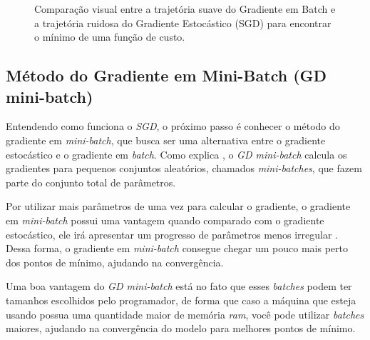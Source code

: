 \begin{figure}[h!]
    \caption{Comparação visual entre a trajetória suave do Gradiente em Batch e a trajetória ruidosa do Gradiente Estocástico (SGD) para encontrar o mínimo de uma função de custo.}
    \label{fig:comparativo-gd-sgd}
\end{figure}

\subsection{Método do Gradiente em Mini-Batch (GD mini-batch)}

Entendendo como funciona o \textit{SGD}, o próximo passo é conhecer o método do gradiente em \textit{mini-batch}, que busca ser uma alternativa entre o gradiente estocástico e o gradiente em \textit{batch}. Como explica \textcite{MaosAObra}, o \textit{GD mini-batch} calcula os gradientes para pequenos conjuntos aleatórios, chamados \textit{mini-batches}, que fazem parte do conjunto total de parâmetros.

Por utilizar mais parâmetros de uma vez para calcular o gradiente, o gradiente em \textit{mini-batch} possui uma vantagem quando comparado com o gradiente estocástico, ele irá apresentar um progresso de parâmetros menos irregular \parencite{MaosAObra}. Dessa forma, o gradiente em \textit{mini-batch} consegue chegar um pouco mais perto dos pontos de mínimo, ajudando na convergência.

Uma boa vantagem do \textit{GD mini-batch} está no fato que esses \textit{batches} podem ter tamanhos escolhidos pelo programador, de forma que caso a máquina que esteja usando possua uma quantidade maior de memória \textit{ram}, você pode utilizar \textit{batches} maiores, ajudando na convergência do modelo para melhores pontos de mínimo.

